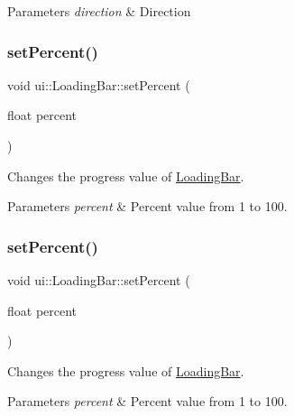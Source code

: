 \begin{DoxyParams}{Parameters}
{\em direction} & Direction \\
\hline
\end{DoxyParams}
\mbox{\label{classui_1_1LoadingBar_ad26d11482f885dab57b56885bfed52d3}} 
\subsubsection{\texorpdfstring{set\+Percent()}{setPercent()}\hspace{0.1cm}{\footnotesize\ttfamily [1/2]}}
{\footnotesize\ttfamily void ui\+::\+Loading\+Bar\+::set\+Percent (\begin{DoxyParamCaption}\item[{float}]{percent }\end{DoxyParamCaption})}

Changes the progress value of \hyperlink{classui_1_1LoadingBar}{Loading\+Bar}.


\begin{DoxyParams}{Parameters}
{\em percent} & Percent value from 1 to 100. \\
\hline
\end{DoxyParams}
\mbox{\label{classui_1_1LoadingBar_ad26d11482f885dab57b56885bfed52d3}} 
\subsubsection{\texorpdfstring{set\+Percent()}{setPercent()}\hspace{0.1cm}{\footnotesize\ttfamily [2/2]}}
{\footnotesize\ttfamily void ui\+::\+Loading\+Bar\+::set\+Percent (\begin{DoxyParamCaption}\item[{float}]{percent }\end{DoxyParamCaption})}

Changes the progress value of \hyperlink{classui_1_1LoadingBar}{Loading\+Bar}.


\begin{DoxyParams}{Parameters}
{\em percent} & Percent value from 1 to 100. \\
\hline
\end{DoxyParams}
\mbox{\label{classui_1_1LoadingBar_adbc9e1eb4d8bb1881d37506443f1ee6d}} 
